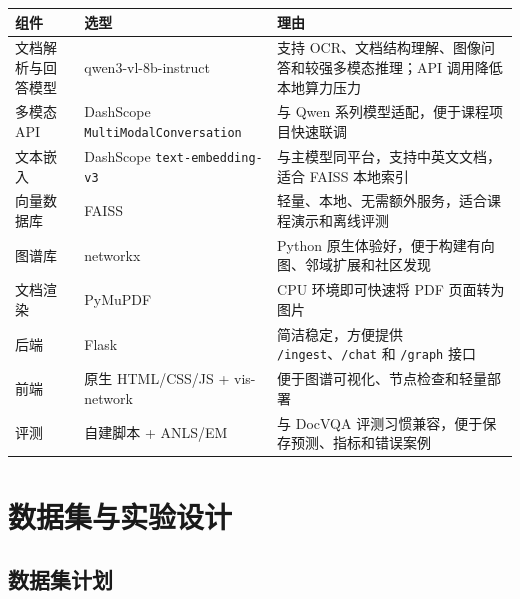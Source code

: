 \begin{longtable}[]{@{}
  >{\raggedright\arraybackslash}p{}
  >{\raggedright\arraybackslash}p{}
  >{\raggedright\arraybackslash}p{}@{}}
\toprule\noalign{}
\begin{minipage}[b]{\linewidth}\raggedright
组件
\end{minipage} & \begin{minipage}[b]{\linewidth}\raggedright
选型
\end{minipage} & \begin{minipage}[b]{\linewidth}\raggedright
理由
\end{minipage} \\
\midrule\noalign{}
\endhead
\bottomrule\noalign{}
\endlastfoot
文档解析与回答模型 & qwen3-vl-8b-instruct & 支持
OCR、文档结构理解、图像问答和较强多模态推理；API 调用降低本地算力压力 \\
多模态 API & DashScope \texttt{MultiModalConversation} & 与 Qwen
系列模型适配，便于课程项目快速联调 \\
文本嵌入 & DashScope \texttt{text-embedding-v3} &
与主模型同平台，支持中英文文档，适合 FAISS 本地索引 \\
向量数据库 & FAISS & 轻量、本地、无需额外服务，适合课程演示和离线评测 \\
图谱库 & networkx & Python
原生体验好，便于构建有向图、邻域扩展和社区发现 \\
文档渲染 & PyMuPDF & CPU 环境即可快速将 PDF 页面转为图片 \\
后端 & Flask & 简洁稳定，方便提供 \texttt{/ingest}、\texttt{/chat} 和
\texttt{/graph} 接口 \\
前端 & 原生 HTML/CSS/JS + vis-network &
便于图谱可视化、节点检查和轻量部署 \\
评测 & 自建脚本 + ANLS/EM & 与 DocVQA
评测习惯兼容，便于保存预测、指标和错误案例 \\
\end{longtable}

\chapter{数据集与实验设计}\label{ux4e94ux6570ux636eux96c6ux4e0eux5b9eux9a8cux8bbeux8ba1}

\section{数据集计划}\label{ux6570ux636eux96c6ux8ba1ux5212}

